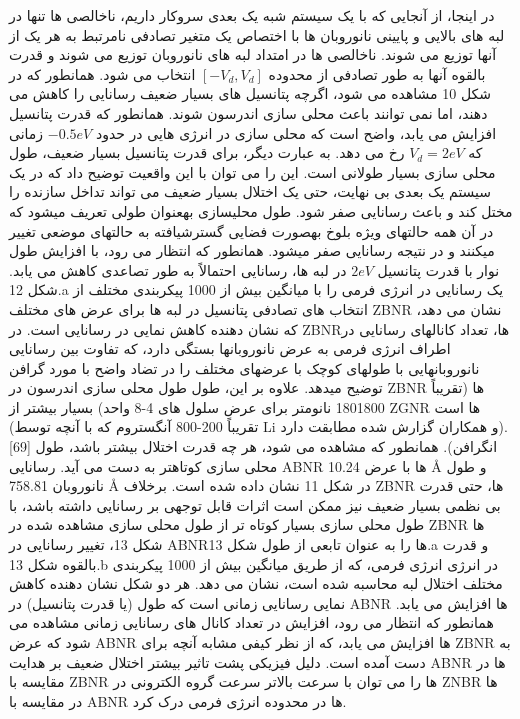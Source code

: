 در اینجا، از آنجایی که با یک سیستم شبه یک بعدی سروکار داریم، ناخالصی ها تنها در لبه های بالایی و پایینی نانوروبان ها با اختصاص یک متغیر تصادفی نامرتبط به هر یک از آنها توزیع می شوند. ناخالصی ها در امتداد لبه های نانوروبان توزیع می شوند و قدرت بالقوه آنها به طور تصادفی از محدوده $[-V_d, V_d]$ انتخاب می شود. همانطور که در شکل 10 مشاهده می شود، اگرچه پتانسیل های بسیار ضعیف رسانایی را کاهش می دهند، اما نمی توانند باعث محلی سازی اندرسون شوند. همانطور که قدرت پتانسیل افزایش می یابد، واضح است که محلی سازی در انرژی هایی در حدود $-0.5 eV$ زمانی که $V_d = 2 eV$ رخ می دهد. به عبارت دیگر، برای قدرت پتانسیل بسیار ضعیف، طول محلی سازی بسیار طولانی است. این را می توان با این واقعیت توضیح داد که در یک سیستم یک بعدی بی نهایت، حتی یک اختلال بسیار ضعیف می تواند تداخل سازنده را مختل کند و باعث رسانایی صفر شود. طول محلیسازی بهعنوان طولی تعریف میشود که در آن همه حالتهای ویژه بلوخ بهصورت فضایی گسترشیافته به حالتهای موضعی تغییر میکنند و در نتیجه رسانایی صفر میشود. همانطور که انتظار می رود، با افزایش طول نوار با قدرت پتانسیل $2 eV$ در لبه ها، رسانایی احتمالاً به طور تصاعدی کاهش می یابد. شکل 12.a یک رسانایی در انرژی فرمی را با میانگین بیش از 1000 پیکربندی مختلف از انتخاب های تصادفی پتانسیل در لبه ها برای عرض های مختلف ZBNR نشان می دهد، که نشان دهنده کاهش نمایی در رسانایی است. در ZBNRها، تعداد کانالهای رسانایی در اطراف انرژی فرمی به عرض نانوروبانها بستگی دارد، که تفاوت بین رسانایی نانوروبانهایی با طولهای کوچک با عرضهای مختلف را در تضاد واضح با مورد گرافن توضیح میدهد. علاوه بر این، طول طول محلی سازی اندرسون در ZBNR ها (تقریباً 1801800 نانومتر برای عرض سلول های 4-8 واحد) بسیار بیشتر از ZGNR ها است (تقریباً 200-800 آنگستروم که با آنچه توسط Li و همکاران گزارش شده مطابقت دارد). [69] انگرافن). همانطور که مشاهده می شود، هر چه قدرت اختلال بیشتر باشد، طول محلی سازی کوتاهتر به دست می آید. رسانایی ABNR ها با عرض 10.24 Å و طول نانوروبان 758.81 Å در شکل 11 نشان داده شده است. برخلاف ZBNR ها، حتی قدرت بی نظمی بسیار ضعیف نیز ممکن است اثرات قابل توجهی بر رسانایی داشته باشد، با طول محلی سازی بسیار کوتاه تر از طول محلی سازی مشاهده شده در ZBNR ها شکل 13، تغییر رسانایی در ABNRها را به عنوان تابعی از طول شکل 13.a و قدرت بالقوه شکل 13.b در انرژی انرژی فرمی، که از طریق میانگین بیش از 1000 پیکربندی مختلف اختلال لبه محاسبه شده است، نشان می دهد. هر دو شکل نشان دهنده کاهش نمایی رسانایی زمانی است که طول (یا قدرت پتانسیل) در ABNR ها افزایش می یابد. همانطور که انتظار می رود، افزایش در تعداد کانال های رسانایی زمانی مشاهده می شود که عرض ABNR ها افزایش می یابد، که از نظر کیفی مشابه آنچه برای ZBNR به دست آمده است. دلیل فیزیکی پشت تاثیر بیشتر اختلال ضعیف بر هدایت ABNR ها در مقایسه با ZBNR ها را می توان با سرعت بالاتر سرعت گروه الکترونی در ZNBR ها در مقایسه با ABNR ها در محدوده انرژی فرمی درک کرد.

